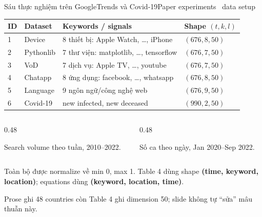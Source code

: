 \documentclass[aspectratio=169,11pt]{beamer}
\begin{document}
\begin{frame}[shrink=33]{Sáu thực nghiệm trên GoogleTrends và Covid-19}{Paper experiments \textperiodcentered\ data setup}
\centering
{\small
\begin{tabular}{@{}llp{7.0cm}l@{}}
  \toprule
  ID & Dataset & Keywords / signals & Shape $(t,k,l)$\\
  \midrule
  1 & Device & 8 thiết bị: Apple Watch, \ldots, iPhone & $(676,8,50)$\\
  2 & Pythonlib & 7 thư viện: matplotlib, \ldots, tensorflow & $(676,7,50)$\\
  3 & VoD & 7 dịch vụ: Apple TV, \ldots, youtube & $(676,7,50)$\\
  4 & Chatapp & 8 ứng dụng: facebook, \ldots, whatsapp & $(676,8,50)$\\
  5 & Language & 9 ngôn ngữ/công nghệ web & $(676,9,50)$\\
  6 & Covid-19 & new infected, new deceased & $(990,2,50)$\\
  \bottomrule
\end{tabular}}
\vspace{4mm}
\begin{columns}[T,onlytextwidth]
\begin{column}{0.48\textwidth}
\begin{intuition}[GoogleTrends]
  Search volume theo tuần, 2010--2022.
\end{intuition}
\end{column}
\begin{column}{0.48\textwidth}
\begin{mathcard}[Covid-19]
  Số ca theo ngày, Jan 2020--Sep 2022.
\end{mathcard}
\end{column}
\end{columns}
\vspace{3mm}
\begin{questioncard}
  Toàn bộ được normalize về min 0, max 1. Table 4 dùng shape \textbf{(time, keyword, location)}; equations dùng \textbf{(keyword, location, time)}.
\end{questioncard}
\vspace{2mm}
\begin{caution}
  Prose ghi 48 countries còn Table 4 ghi dimension 50; slide không tự “sửa” mâu thuẫn này.
\end{caution}
\vspace{1mm}
\end{frame}
\end{document}
